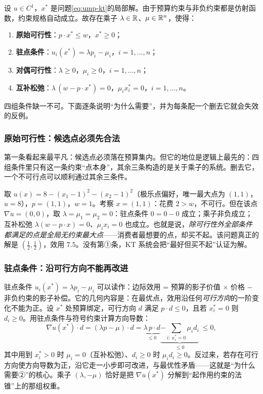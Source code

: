 \begin{theorem}
\label{thm:kt}
设 $u\in C^1$，$x^*$ 是问题\eqref{eq:ump-kt}的局部解。由于预算约束与非负约束都是仿射函数，约束规格自动成立。故存在乘子 $\lambda\in\mathbb{R}$、$\mu\in\mathbb{R}^n$，使得：
\begin{enumerate}
\item \textbf{原始可行性}：$p\cdot x^*\le w$，$x^*\ge 0$；
\item \textbf{驻点条件}：$u_i(x^*)=\lambda p_i-\mu_i$，$i=1,\dots,n$；
\item \textbf{对偶可行性}：$\lambda\ge 0$，$\mu_i\ge 0$，$i=1,\dots,n$；
\item \textbf{互补松弛}：$\lambda\,(w-p\cdot x^*)=0$，$\mu_i x_i^*=0$，$i=1,\dots,n$。
\end{enumerate}
\end{theorem}

四组条件缺一不可。下面逐条说明“为什么需要”，并为每条配一个删去它就会失效的反例。

\subsubsection{原始可行性：候选点必须先合法}

第一条看起来最平凡：候选点必须落在预算集内。但它的地位是逻辑上最先的：四组条件里只有这一条约束“点本身”，其余三条构造的是关于乘子的系统。删去它，一个不可行点可以顺利通过其余三条件。

\begin{example}
\label{ex:no-feas}
取 $u(x)=8-(x_1-1)^2-(x_2-1)^2$（极乐点偏好，唯一最大点为 $(1,1)$，$u=8$），$p=(1,1)$，$w=1$。考察 $x=(1,1)$：花费 $2>w$，不可行。但在该点 $\nabla u=(0,0)$，取 $\lambda=\mu_1=\mu_2=0$：驻点条件 $0=0-0$ 成立；乘子非负成立；互补松弛 $\lambda(w-p\cdot x)=0$、$\mu_ix_i=0$ 也成立。也就是说，\emph{除可行性外全部条件都满足的点是全局无约束最大点}——消费者最想要的点，却买不起。该问题真正的解是 $(\tfrac12,\tfrac12)$，效用 $7.5$。没有第①条，KT 系统会把“最好但买不起”认证为解。
\end{example}

\subsubsection{驻点条件：沿可行方向不能再改进}

驻点条件 $u_i(x^*)=\lambda p_i-\mu_i$ 可以读作：边际效用 = 预算的影子价值 $\times$ 价格 $-$ 非负约束的影子补偿。它的几何内容是：在最优点，效用沿任何\emph{可行方向}的一阶变化不能为正。设 $x^*$ 处预算绑定，可行方向 $d$ 满足 $p\cdot d\le 0$，且若 $x_i^*=0$ 则 $d_i\ge 0$。用驻点条件与符号约束计算方向导数：
\[
 \nabla u(x^*)\cdot d=(\lambda p-\mu)\cdot d
 =\underbrace{\lambda\,p\cdot d}_{\le 0}
  \underbrace{-\sum_{i:\,x_i^*=0}\mu_i d_i}_{\le 0}\ \le 0,
\]
其中用到 $x_i^*>0$ 时 $\mu_i=0$（互补松弛）、$d_i\ge 0$ 时 $\mu_i d_i\ge 0$。反过来，若存在可行方向使方向导数为正，沿它走一小步即可改进，与最优性矛盾——这就是“为什么需要②”的核心。乘子 $(\lambda,-\mu)$ 恰好是把 $\nabla u(x^*)$ 分解到“起作用约束的法锥”上的那组权重。

